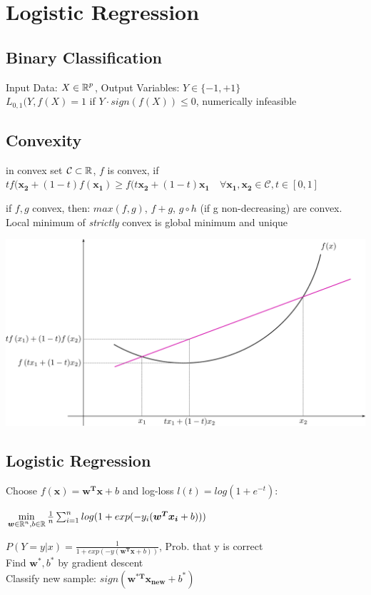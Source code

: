 \documentclass[english]{latex4ei/latex4ei_sheet}
\begin{document}
\section{Logistic Regression}
\begin{sectionbox}

\subsection{Binary Classification}
Input Data: $X \in \operatorname{\mathbb R}^p$, Output Variables: $Y\in\{-1,+1\}$\\
$L_{0,1}(Y,f(X) = 1$ \quad if $Y\cdot sign(f(X)) \leq 0$, numerically infeasible

\subsection{Convexity}
    \begin{emphbox}
    	in convex set $\mathcal{C} \subset \operatorname{\mathbb R}$, $f$ is convex, if $tf(\boldsymbol{x_2}+(1-t)f(\boldsymbol{x_1}) \ge f(t\boldsymbol{x_2}+(1-t)\boldsymbol{x_1} \quad \forall \boldsymbol{x_1,x_2}\in \mathcal{C}, t\in[0,1]$
	\end{emphbox}
	if $f,g$ convex, then: $max(f,g)$, $f+g$, $g\circ h$ (if g non-decreasing) are convex. Local minimum of \emph{strictly} convex is global minimum and unique\\
	\begin{center}
	    \includegraphics[width = 0.7\columnwidth]{figures/convexity.png}
	\end{center}
\subsection{Logistic Regression}

Choose $f(\boldsymbol{x})=\boldsymbol{w^Tx}+b$ and log-loss $l(t)=log(1+e^{-t})$:
\begin{emphbox}
$\min\limits_{\boldsymbol{w}\in\operatorname{\mathbb R}^n,b\in\operatorname{\mathbb R}}\frac{1}{n}\sum_{i=1}^nlog(1+exp(-y_i(\boldsymbol{w^Tx_i}+b)))$
\end{emphbox}
$P(Y=y|x)=\frac{1}{1+exp(-y(\boldsymbol{w^Tx}+b))}$, Prob. that y is correct\\
Find $\boldsymbol{w^*}, b^*$ by gradient descent\\
Classify new sample: $sign(\boldsymbol{w^{*T}x_{new}}+b^*)$


\end{sectionbox}
\end{document}
